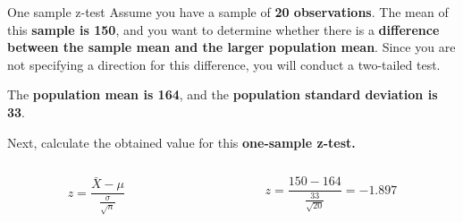 \documentclass[
  ignorenonframetext,
]{beamer}
\begin{document}
\begin{frame}{One sample z-test}
\label{one-sample-z-test}
Assume you have a sample of \textbf{20 observations}. The mean of this
\textbf{sample is 150}, and you want to determine whether there is a
\textbf{difference between the sample mean and the larger population
mean}. Since you are not specifying a direction for this difference, you
will conduct a two-tailed test.

The \textbf{population mean is 164}, and the \textbf{population standard
deviation is 33}.

Next, calculate the obtained value for this \textbf{one-sample z-test.}

\begin{columns}[T]
\begin{column}{0.5\textwidth}
\vspace{1cm}

\[
z = \frac{\bar{X} - \mu}{\frac{\sigma}{\sqrt{n}}}
\]
\end{column}

\begin{column}{0.5\textwidth}
\vspace{1cm}

\[
z = \frac{150 - 164}{\frac{33}{\sqrt{20}}} = -1.897
\]
\end{column}
\end{columns}
\end{frame}
\end{document}
